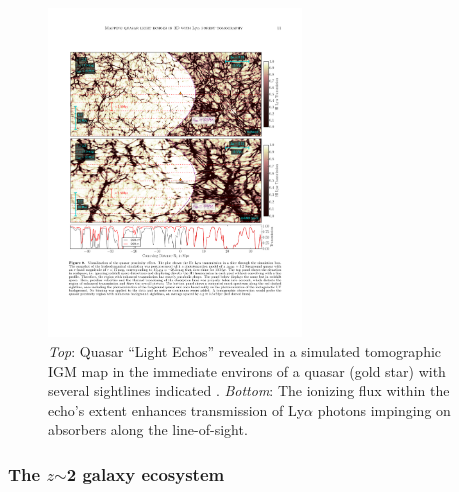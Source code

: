 \begin{figure}
%
\includegraphics[width=0.6\textwidth]{figs/qso_LightEcho_v1.pdf}
%
\caption{{\it Top}: Quasar ``Light Echos'' revealed in a simulated
tomographic IGM map in the immediate environs of a quasar (gold star)
with several sightlines indicated
\citep[from][]{2018arXiv181005156S}. {\it Bottom}: The ionizing flux
within the echo's extent enhances transmission of Ly$\alpha$ photons
impinging on absorbers along the line-of-sight.}
\label{fig:LightEcho}
\end{figure}


\subsubsection{The $z$$\sim$2 galaxy ecosystem}
\label{sec:z2galaxies}

